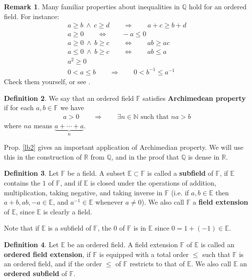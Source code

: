 \documentclass[12pt,b5paper,notitlepage]{article}
\theoremstyle{definition}
\newtheorem{df}{Definition}[section]
\newtheorem{rem}[df]{Remark}
\theoremstyle{plain}
\newcommand{\Nbb}{\mathbb N}
\newcommand{\Qbb}{\mathbb Q}
\newcommand{\Rbb}{\mathbb R}
\newcommand{\Ebb}{\mathbb E}
\newcommand{\Fbb}{\mathbb F}
\numberwithin{equation}{section}
\begin{document}
\begin{rem}
Many familiar properties about inequalities in $\Qbb$ hold for an ordered field. For instance: 
\begin{gather*}
a\geq b~\wedge~ c\geq d \qquad\Longrightarrow\qquad a+c\geq b+d\\
a\geq0\qquad\Longleftrightarrow\qquad -a\leq0\\
a\geq0~\wedge~b\geq c\qquad\Longleftrightarrow\qquad ab\geq ac\\
a\leq0~\wedge~b\geq c\qquad\Longleftrightarrow\qquad ab\leq a\\
a^2\geq0\\
0<a\leq b\qquad\Longrightarrow\qquad 0< b^{-1}\leq a^{-1}
\end{gather*}
Check them yourself, or see \cite[Prop. 1.18]{Rud-P}.
\end{rem}


\begin{df}
We say that an ordered field $\Fbb$ satisfies  \textbf{Archimedean property} if for each $a,b\in\Fbb$ we have
\begin{align*}
a> 0\qquad\Longrightarrow \qquad\exists n\in\Nbb\text{ such that }na>b
\end{align*}
where $na$ means $\underbrace{a+\cdots+a}_{n}$.
\end{df}

Prop. \ref{lb2} gives an important application of Archimedian property. We will use this in the construction of $\Rbb$ from $\Qbb$, and in the proof that $\Qbb$ is dense in $\Rbb$. 

\begin{df}
Let $\Fbb$ be a field. A subset $\Ebb\subset\Fbb$ is called a  \textbf{subfield}  of $\Fbb$, if $\Ebb$ contains the $1$ of $\Fbb$, and if $\Ebb$ is closed under the operations of addition, multiplication, taking negative, and taking inverse in $\Fbb$ (i.e. if $a,b\in\Ebb$ then $a+b,ab,-a\in\Ebb$, and $a^{-1}\in\Ebb$ whenever $a\neq 0$). We also call $\Fbb$ a  \textbf{field extension} of $\Ebb$, since $\Ebb$ is clearly a field.
\end{df}

Note that if $\Ebb$ is a subfield of $\Fbb$, the $0$ of $\Fbb$ is in $\Ebb$ since $0=1+(-1)\in\Ebb$.

\begin{df}
Let $\Ebb$ be an ordered field. A field extension $\Fbb$ of $\Ebb$ is called an  \textbf{ordered field extension}, if $\Fbb$ is equipped with a total order $\leq$ such that $\Fbb$ is an ordered field, and if the order $\leq$ of $\Fbb$ restricts to that of $\Ebb$. We also call $\Ebb$ an \textbf{ordered subfield} of $\Fbb$.
\end{df}
\end{document}
